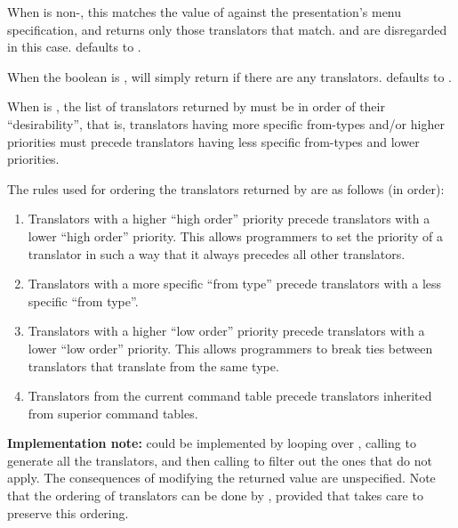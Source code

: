 When  is non-, this matches the value of 
against the presentation's menu specification, and returns only those
translators that match.   and  are disregarded in
this case.   defaults to .

When the boolean  is , 
will simply return  if there are any translators.  
defaults to .

When  is , the list of translators returned by
 must be in order of their ``desirability'',
that is, translators having more specific from-types and/or higher priorities
must precede translators having less specific from-types and lower priorities.

The rules used for ordering the translators returned by
 are as follows (in order):

\begin{enumerate}
\item Translators with a higher ``high order'' priority precede translators with
a lower ``high order'' priority.  This allows programmers to set the priority of
a translator in such a way that it always precedes all other translators.

\item Translators with a more specific ``from type'' precede translators with a
less specific ``from type''.

\item Translators with a higher ``low order'' priority precede translators with
a lower ``low order'' priority.  This allows programmers to break ties between
translators that translate from the same type.

\item Translators from the current command table precede translators inherited
from superior command tables.
\end{enumerate}

{\bf Implementation note:}  could be implemented
by looping over , calling 
to generate all the translators, and then calling 
to filter out the ones that do not apply.  The consequences of modifying the
returned value are unspecified.  Note that the ordering of translators can be
done by , provided that
 takes care to preserve this ordering.

